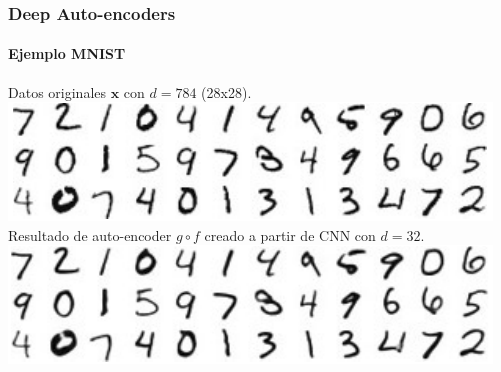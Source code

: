 \documentclass[aspectratio=169]{beamer}
\newenvironment{blockm}[1]{%
  \begin{block}{\textbf{#1}}%
  }{%
  \end{block}%
  \vspace{1em}%
}
\begin{document}
\begin{frame}[c]\frametitle{Deep Auto-encoders}\framesubtitle{Ejemplo MNIST}
  \vspace{-.2cm}
  \begin{center}
    Datos originales $\mathbf{x}$ con $d=784$ (28x28).\\
    \vspace{.2cm}
    \includegraphics[width=.35\textwidth, center]{imgs/tema4/aenc/ex_or.pdf}\\
    \vspace{.5cm}
    Resultado de auto-encoder $g \circ f$ creado a partir de CNN con $d=32$.\\
    \vspace{.2cm}
    \includegraphics[width=.35\textwidth, center]{imgs/tema4/aenc/ex_cnn_32.pdf}\\ 
  \end{center}    
\end{frame}


\end{document}
